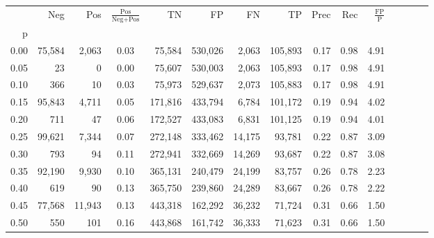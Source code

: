 \begin{tabular}{rrrcrrrrrrrrrrr}
\toprule
{} &     Neg &     Pos & $\frac{\text{Pos}}{\text{Neg}+\text{Pos}}$ &       TN &       FP &       FN &       TP &  Prec &   Rec & $\frac{\text{FP}}{\text{P}}$ \\
p    &         &         &                                            &          &          &          &          &       &       &                              \\
\midrule
0.00 &  75,584 &   2,063 &                                       0.03 &   75,584 &  530,026 &    2,063 &  105,893 &  0.17 &  0.98 &                         4.91 \\
0.05 &      23 &       0 &                                       0.00 &   75,607 &  530,003 &    2,063 &  105,893 &  0.17 &  0.98 &                         4.91 \\
0.10 &     366 &      10 &                                       0.03 &   75,973 &  529,637 &    2,073 &  105,883 &  0.17 &  0.98 &                         4.91 \\
0.15 &  95,843 &   4,711 &                                       0.05 &  171,816 &  433,794 &    6,784 &  101,172 &  0.19 &  0.94 &                         4.02 \\
0.20 &     711 &      47 &                                       0.06 &  172,527 &  433,083 &    6,831 &  101,125 &  0.19 &  0.94 &                         4.01 \\
0.25 &  99,621 &   7,344 &                                       0.07 &  272,148 &  333,462 &   14,175 &   93,781 &  0.22 &  0.87 &                         3.09 \\
0.30 &     793 &      94 &                                       0.11 &  272,941 &  332,669 &   14,269 &   93,687 &  0.22 &  0.87 &                         3.08 \\
0.35 &  92,190 &   9,930 &                                       0.10 &  365,131 &  240,479 &   24,199 &   83,757 &  0.26 &  0.78 &                         2.23 \\
0.40 &     619 &      90 &                                       0.13 &  365,750 &  239,860 &   24,289 &   83,667 &  0.26 &  0.78 &                         2.22 \\
0.45 &  77,568 &  11,943 &                                       0.13 &  443,318 &  162,292 &   36,232 &   71,724 &  0.31 &  0.66 &                         1.50 \\
0.50 &     550 &     101 &                                       0.16 &  443,868 &  161,742 &   36,333 &   71,623 &  0.31 &  0.66 &                         1.50 \\

\end{tabular}
